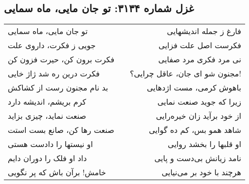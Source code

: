 \begin{center}
\section*{غزل شماره ۳۱۳۴: تو جان مایی، ماه سمایی}
\label{sec:3134}
\begin{longtable}{l p{0.5cm} r}
تو جان مایی، ماه سمایی
&&
فارغ ز جمله اندیشهایی
\\
جویی ز فکرت، داروی علت
&&
فکرست اصل علت فزایی
\\
فکرت برون کن، حیرت فزون کن
&&
نی مرد فکری مرد صفایی
\\
فکرت درین ره شد ژاژ خایی
&&
مجنون شو ای جان، عاقل چرایی؟!
\\
بد نام مجنون رست از کشاکش
&&
باهوش کرمی، مست اژدهایی
\\
کرم بریشم، اندیشه دارد
&&
زیرا که جوید صنعت نمایی
\\
صنعت نماید، چیزی بزاید
&&
از خود برآید زان خیره‌رایی
\\
صنعت رها کن، صانع بست استت
&&
شاهد همو بس، کم ده گوایی
\\
او نیستها را دادست هستی
&&
او قلبها را بخشد روایی
\\
داد او فلک را دوران دایم
&&
نامد زیانش بی‌دست و پایی
\\
خامش! برآن باش که پر نگویی
&&
هرچند با خود بر می‌نیایی
\\
\end{longtable}
\end{center}

